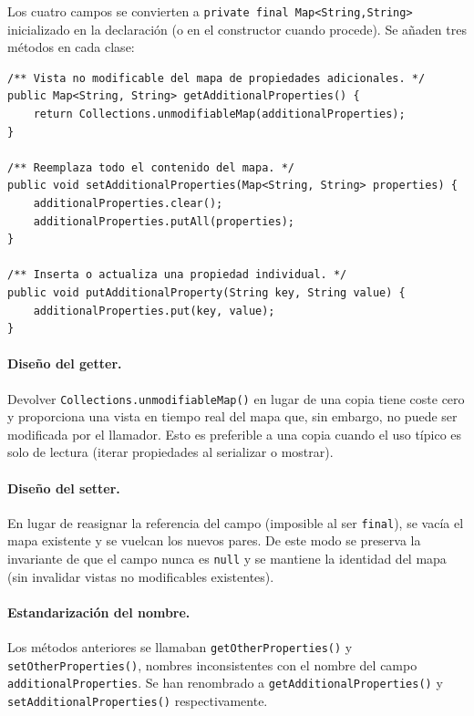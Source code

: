 \documentclass[11pt,a4paper]{article}
\newcommand{\code}[1]{\texttt{#1}}
\begin{document}
Los cuatro campos se convierten a \code{private final Map<String,String>}
inicializado en la declaración (o en el constructor cuando procede).
Se añaden tres métodos en cada clase:

\begin{lstlisting}
/** Vista no modificable del mapa de propiedades adicionales. */
public Map<String, String> getAdditionalProperties() {
    return Collections.unmodifiableMap(additionalProperties);
}

/** Reemplaza todo el contenido del mapa. */
public void setAdditionalProperties(Map<String, String> properties) {
    additionalProperties.clear();
    additionalProperties.putAll(properties);
}

/** Inserta o actualiza una propiedad individual. */
public void putAdditionalProperty(String key, String value) {
    additionalProperties.put(key, value);
}
\end{lstlisting}

\paragraph{Diseño del getter.}
Devolver \code{Collections.unmodifiableMap()} en lugar de una copia tiene
coste cero y proporciona una vista en tiempo real del mapa que, sin embargo,
no puede ser modificada por el llamador. Esto es preferible a una copia
cuando el uso típico es solo de lectura (iterar propiedades al serializar
o mostrar).

\paragraph{Diseño del setter.}
En lugar de reasignar la referencia del campo (imposible al ser \code{final}),
se vacía el mapa existente y se vuelcan los nuevos pares. De este modo se
preserva la invariante de que el campo nunca es \code{null} y se mantiene
la identidad del mapa (sin invalidar vistas no modificables existentes).

\paragraph{Estandarización del nombre.}
Los métodos anteriores se llamaban \code{getOtherProperties()} y
\code{setOtherProperties()}, nombres inconsistentes con el nombre del
campo \code{additionalProperties}. Se han renombrado a
\code{getAdditionalProperties()} y \code{setAdditionalProperties()}
respectivamente.

\end{document}
